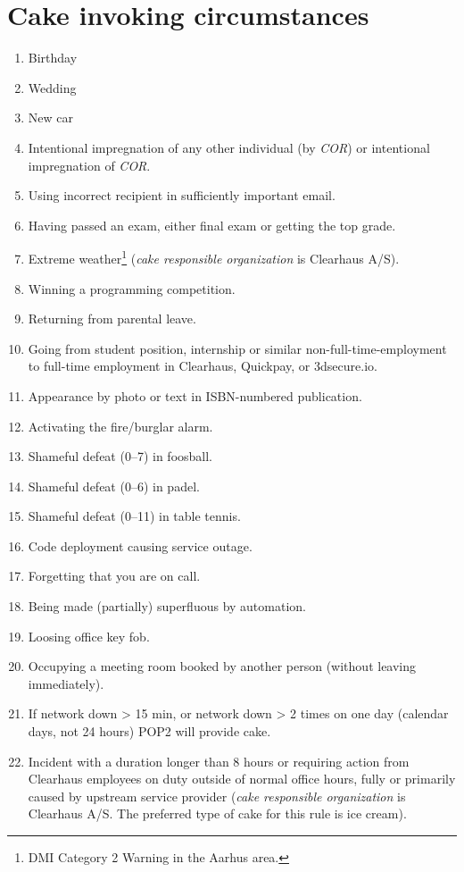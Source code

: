 \documentclass[a4paper, oneside, article]{memoir}
\newcounter{tbc}
\begin{document}
    \chapter{Cake invoking circumstances}\label{chp:circumstances}
    \begin{enumerate}[§ 1]
        \setcounter{enumi}{\value{tbc}}

        \item Birthday
        \item Wedding
        \item New car
        \item Intentional impregnation of any other individual (by \emph{COR}) or intentional impregnation of \emph{COR}.
        \item Using incorrect recipient in sufficiently important email.
        \item Having passed an exam, either final exam or getting the top grade.
        \item Extreme weather\footnote{DMI Category 2 Warning in the Aarhus area.} (\emph{cake responsible organization} is Clearhaus A/S).
        \item Winning a programming competition.
        \item Returning from parental leave.
        \item Going from student position, internship or similar non-full-time-employment to full-time employment in Clearhaus, Quickpay, or 3dsecure.io.
        \item Appearance by photo or text in ISBN-numbered publication.
        \item Activating the fire/burglar alarm.
        \item Shameful defeat (0--7) in foosball.
        \item Shameful defeat (0--6) in padel.
        \item Shameful defeat (0--11) in table tennis.
        \item Code deployment causing service outage.
        \item Forgetting that you are on call.
        \item Being made (partially) superfluous by automation.
        \item Loosing office key fob.
        \item Occupying a meeting room booked by another person (without leaving immediately).
        \item If network down > 15 min, or network down > 2 times on one day (calendar days, not 24 hours) POP2 will provide cake.
        \item Incident with a duration longer than 8 hours or requiring action from Clearhaus employees on duty outside of normal office hours, fully or primarily caused by upstream service provider (\emph{cake responsible organization} is Clearhaus A/S. The preferred type of cake for this rule is ice cream).
    \end{enumerate}
\end{document}
